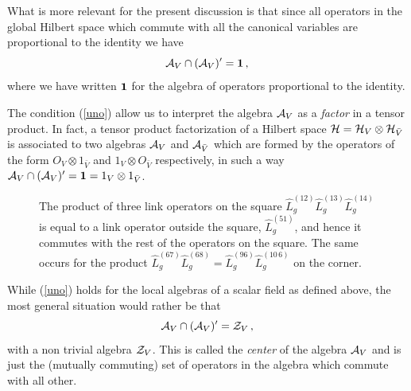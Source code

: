 \documentclass[12pt,a4paper]{article}
\begin{document}
What is more relevant for the present discussion is that since all operators in the global Hilbert space which commute with all the canonical variables are 
proportional to the identity we have
\begin{equation}
{\cal A}_{V}\cap ({\cal A}_{V})^\prime={\bf 1}\,,\label{uno}
\end{equation}
where we have written ${\bf 1}$ for the algebra of operators proportional to the identity. 

The condition (\ref{uno}) allow us to interpret the algebra ${\cal A}_V$ as a {\sl factor} in a tensor product. In fact, a 
tensor product factorization of a Hilbert space ${\cal H}={\cal H}_V\otimes {\cal H}_{\bar{V}}$ is associated to two algebras ${\cal A}_V$ 
and ${\cal A}_{\bar{V}}$ which are formed by the operators of the form $O_V\otimes 1_{\bar{V}}$ and $1_{V}\otimes O_{\bar{V}}$ respectively, 
in such a way ${\cal A}_{V}\cap ({\cal A}_{V})^\prime={\bf 1}=1_V\otimes 1_{\bar{V}}$.


\begin{figure}
\centering
\leavevmode
\epsfysize=4cm
\bigskip
\caption{
The product of three link operators on the square $\hat{L}_g^{(12)} \hat{L}_g^{(13)} \hat{L}_g^{(14)}$ is equal to a link operator outside the 
square, $\hat{L}_g^{(51)}$, and hence it commutes with the rest of the operators on the square. The same occurs for the 
product $\hat{L}_g^{(67)} \hat{L}_g^{(68)}=\hat{L}_g^{(96)} \hat{L}_g^{(10\,6)}$ on the corner.}
\label{figu1}
\end{figure}


While (\ref{uno}) holds for the local algebras of a scalar field as defined above, the most general situation would rather be that  
\begin{equation}
{\cal A}_V\cap ({\cal A}_V)^\prime={\cal Z}_V\,,
\end{equation}
with a non trivial algebra ${\cal Z}_V$. This is called the {\sl center} of the algebra ${\cal A}_V$ and is just the (mutually commuting) set of operators in the 
algebra which commute with all other. 
\end{document}
